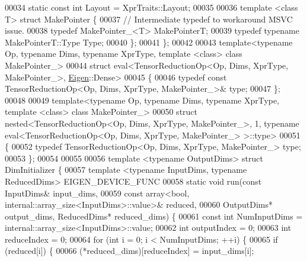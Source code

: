 \begin{DoxyCode}
00034   \textcolor{keyword}{static} \textcolor{keyword}{const} \textcolor{keywordtype}{int} Layout = XprTraits::Layout;
00035 
00036   \textcolor{keyword}{template} <\textcolor{keyword}{class} T> \textcolor{keyword}{struct }MakePointer \{
00037     \textcolor{comment}{// Intermediate typedef to workaround MSVC issue.}
00038     \textcolor{keyword}{typedef} MakePointer\_<T> MakePointerT;
00039     \textcolor{keyword}{typedef} \textcolor{keyword}{typename} MakePointerT::Type Type;
00040   \};
00041 \};
00042 
00043 \textcolor{keyword}{template}<\textcolor{keyword}{typename} Op, \textcolor{keyword}{typename} Dims, \textcolor{keyword}{typename} XprType, \textcolor{keyword}{template} <\textcolor{keyword}{class}> \textcolor{keyword}{class }MakePointer\_>
00044 \textcolor{keyword}{struct }eval<TensorReductionOp<Op, Dims, XprType, MakePointer\_>, \hyperlink{namespace_eigen}{Eigen}::Dense>
00045 \{
00046   \textcolor{keyword}{typedef} \textcolor{keyword}{const} TensorReductionOp<Op, Dims, XprType, MakePointer\_>& type;
00047 \};
00048 
00049 \textcolor{keyword}{template}<\textcolor{keyword}{typename} Op, \textcolor{keyword}{typename} Dims, \textcolor{keyword}{typename} XprType, \textcolor{keyword}{template} <\textcolor{keyword}{class}> \textcolor{keyword}{class }MakePointer\_>
00050 \textcolor{keyword}{struct }nested<TensorReductionOp<Op, Dims, XprType, MakePointer\_>, 1, typename eval<TensorReductionOp<Op, 
      Dims, XprType, MakePointer\_> >::type>
00051 \{
00052   \textcolor{keyword}{typedef} TensorReductionOp<Op, Dims, XprType, MakePointer\_> type;
00053 \};
00054 
00055 
00056 \textcolor{keyword}{template} <\textcolor{keyword}{typename} OutputDims> \textcolor{keyword}{struct }DimInitializer \{
00057   \textcolor{keyword}{template} <\textcolor{keyword}{typename} InputDims, \textcolor{keyword}{typename} ReducedDims> EIGEN\_DEVICE\_FUNC
00058   \textcolor{keyword}{static} \textcolor{keywordtype}{void} run(\textcolor{keyword}{const} InputDims& input\_dims,
00059                   \textcolor{keyword}{const} array<\textcolor{keywordtype}{bool}, internal::array\_size<InputDims>::value>& reduced,
00060                   OutputDims* output\_dims, ReducedDims* reduced\_dims) \{
00061     \textcolor{keyword}{const} \textcolor{keywordtype}{int} NumInputDims = internal::array\_size<InputDims>::value;
00062     \textcolor{keywordtype}{int} outputIndex = 0;
00063     \textcolor{keywordtype}{int} reduceIndex = 0;
00064     \textcolor{keywordflow}{for} (\textcolor{keywordtype}{int} i = 0; i < NumInputDims; ++i) \{
00065       \textcolor{keywordflow}{if} (reduced[i]) \{
00066         (*reduced\_dims)[reduceIndex] = input\_dims[i];

\end{DoxyCode}

